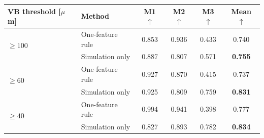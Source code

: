 \begin{tabular}{llcccc}
\toprule
VB threshold [$\mu$m] & Method & M1 $\uparrow$ & M2 $\uparrow$ & M3 $\uparrow$ & Mean $\uparrow$ \\
\midrule
\multirow{2}{*}{$\ge100$} & One-feature rule & 0.853 & 0.936 & 0.433 & 0.740 \\
 & Simulation only & 0.887 & 0.807 & 0.571 & \cellcolor{gray!20}\textbf{0.755} \\
\midrule
\multirow{2}{*}{$\ge60$} & One-feature rule & 0.927 & 0.870 & 0.415 & 0.737 \\
 & Simulation only & 0.925 & 0.809 & 0.759 & \cellcolor{gray!20}\textbf{0.831} \\
\midrule
\multirow{2}{*}{$\ge40$} & One-feature rule & 0.994 & 0.941 & 0.398 & 0.777 \\
 & Simulation only & 0.827 & 0.893 & 0.782 & \cellcolor{gray!20}\textbf{0.834} \\
\bottomrule
\end{tabular}
